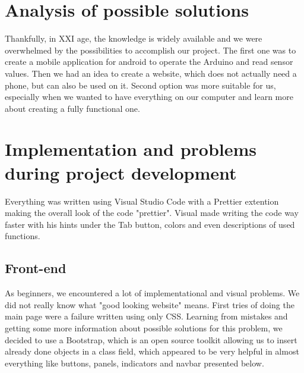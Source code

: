 \documentclass[oneside,a4paper,11pt]{report}
\begin{document}
\section{Analysis of possible solutions}
\hspace{1cm}Thankfully, in XXI age, the knowledge is widely available and we were overwhelmed by the possibilities to accomplish our project. The first one was to create a mobile application for android to operate the Arduino and read sensor values. Then we had an idea to create a website, which does not actually need a phone, but can also be used on it. Second option was more suitable for us, especially when we wanted to have everything on our computer and learn more about creating a fully functional one.
\section{Implementation and problems during project development}
\hspace{1cm}Everything was written using Visual Studio Code with a Prettier extention making the overall look of the code "prettier". Visual made writing the code way faster with his hints under the Tab button, colors and even descriptions of used functions.
\subsection{Front-end}
\hspace{1cm}As beginners, we encountered a lot of implementational and visual problems. We did not really know what "good looking website" means. First tries of doing the main page were a failure written using only CSS. Learning from mistakes and getting some more information about possible solutions for this problem, we decided to use a Bootstrap, which is an open source toolkit allowing us to insert already done objects in a class field, which appeared to be very helpful in almost everything like buttons, panels, indicators and navbar presented below.
\end{document}
